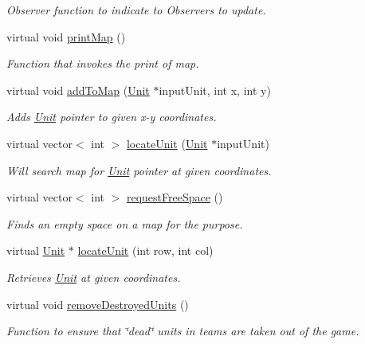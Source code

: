 \begin{DoxyCompactItemize}
\begin{DoxyCompactList}\small\item\em Observer function to indicate to Observers to update. \end{DoxyCompactList}\item 
\hypertarget{class_master_a4382148153bc6297fa62d43380a518c0}{}virtual void \hyperlink{class_master_a4382148153bc6297fa62d43380a518c0}{print\+Map} ()\label{class_master_a4382148153bc6297fa62d43380a518c0}

\begin{DoxyCompactList}\small\item\em Function that invokes the print of map. \end{DoxyCompactList}\item 
\hypertarget{class_master_aea6e7956d8e9dcca77f99557850cdf3a}{}virtual void \hyperlink{class_master_aea6e7956d8e9dcca77f99557850cdf3a}{add\+To\+Map} (\hyperlink{class_unit}{Unit} $\ast$input\+Unit, int x, int y)\label{class_master_aea6e7956d8e9dcca77f99557850cdf3a}

\begin{DoxyCompactList}\small\item\em Adds \hyperlink{class_unit}{Unit} pointer to given x-\/y coordinates. \end{DoxyCompactList}\item 
virtual vector$<$ int $>$ \hyperlink{class_master_a355cd520378a1ee4bbf340badf4163ae}{locate\+Unit} (\hyperlink{class_unit}{Unit} $\ast$input\+Unit)
\begin{DoxyCompactList}\small\item\em Will search map for \hyperlink{class_unit}{Unit} pointer at given coordinates. \end{DoxyCompactList}\item 
virtual vector$<$ int $>$ \hyperlink{class_master_a3ddcc34d8f2cbf14a247b7021e6cb57a}{request\+Free\+Space} ()
\begin{DoxyCompactList}\small\item\em Finds an empty space on a map for the purpose. \end{DoxyCompactList}\item 
virtual \hyperlink{class_unit}{Unit} $\ast$ \hyperlink{class_master_a1401033a876ae9e4b38e5879537c5b2a}{locate\+Unit} (int row, int col)
\begin{DoxyCompactList}\small\item\em Retrieves \hyperlink{class_unit}{Unit} at given coordinates. \end{DoxyCompactList}\item 
\hypertarget{class_master_aadca1629b9756f20d101569fc783fbca}{}virtual void \hyperlink{class_master_aadca1629b9756f20d101569fc783fbca}{remove\+Destroyed\+Units} ()\label{class_master_aadca1629b9756f20d101569fc783fbca}

\begin{DoxyCompactList}\small\item\em Function to ensure that \char`\"{}dead\char`\"{} units in teams are taken out of the game. \end{DoxyCompactList}\end{DoxyCompactItemize}
